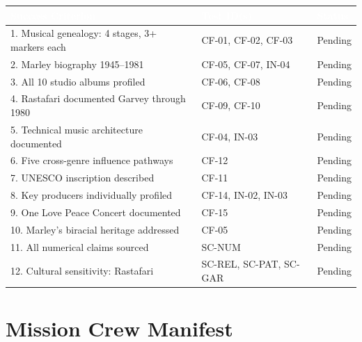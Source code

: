 \documentclass[11pt,letterpaper]{article}
\newcommand{\tableheader}[1]{\textbf{\sffamily\textcolor{white}{#1}}}
\begin{document}
\begin{center}
\begin{tabularx}{\textwidth}{XL{3.5cm}C{1.5cm}}
\toprule
{}
\tableheader{Success Criterion} & \tableheader{Test ID(s)} & \tableheader{Status} \\
. Musical genealogy: 4 stages, 3+ markers each & CF-01, CF-02, CF-03 & Pending \\
2. Marley biography 1945--1981 & CF-05, CF-07, IN-04 & Pending \\
3. All 10 studio albums profiled & CF-06, CF-08 & Pending \\
4. Rastafari documented Garvey through 1980 & CF-09, CF-10 & Pending \\
5. Technical music architecture documented & CF-04, IN-03 & Pending \\
6. Five cross-genre influence pathways & CF-12 & Pending \\
7. UNESCO inscription described & CF-11 & Pending \\
8. Key producers individually profiled & CF-14, IN-02, IN-03 & Pending \\
9. One Love Peace Concert documented & CF-15 & Pending \\
10. Marley's biracial heritage addressed & CF-05 & Pending \\
11. All numerical claims sourced & SC-NUM & Pending \\
12. Cultural sensitivity: Rastafari & SC-REL, SC-PAT, SC-GAR & Pending \\
\bottomrule
\end{tabularx}
\end{center}

\section{Mission Crew Manifest}
\end{document}
